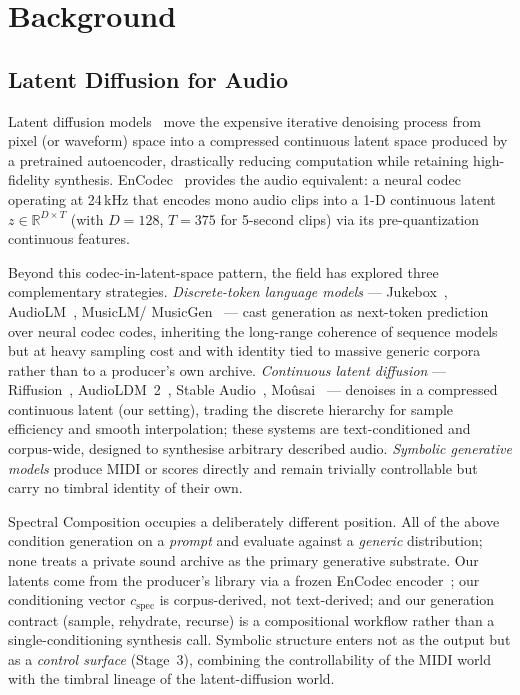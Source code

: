 \documentclass[12pt,a4paper]{article}
\begin{document}
\section{Background}
\label{sec:background}

\subsection{Latent Diffusion for Audio}
\label{subsec:bg_lda}

Latent diffusion models~\cite{rombach2022} move the expensive iterative
denoising process from pixel (or waveform) space into a compressed
continuous latent space produced by a pretrained autoencoder, drastically
reducing computation while retaining high-fidelity synthesis.
EnCodec~\cite{defossez2022} provides the audio equivalent: a neural codec
operating at 24\,kHz that encodes mono audio clips into a 1-D continuous
latent $z \in \mathbb{R}^{D \times T}$ (with $D=128$, $T=375$ for 5-second
clips) via its pre-quantization continuous features.

Beyond this codec-in-latent-space pattern, the field has explored three
complementary strategies. \emph{Discrete-token language models} —
Jukebox~\cite{jukebox2020}, AudioLM~\cite{audiolm2022}, MusicLM/
MusicGen~\cite{musiclm2023,audiocraft2023} — cast generation as
next-token prediction over neural codec codes, inheriting the long-range
coherence of sequence models but at heavy sampling cost and with identity
tied to massive generic corpora rather than to a producer's own archive.
\emph{Continuous latent diffusion} — Riffusion~\cite{riffusion2022},
AudioLDM~2~\cite{audioldm2_2023}, Stable Audio~\cite{stableaudio2023},
Mo\^usai~\cite{mousai2023} — denoises in a compressed continuous latent
(our setting), trading the discrete hierarchy for sample efficiency and
smooth interpolation; these systems are text-conditioned and corpus-wide,
designed to synthesise arbitrary described audio. \emph{Symbolic
generative models} produce MIDI or scores directly and remain trivially
controllable but carry no timbral identity of their own.

Spectral Composition occupies a deliberately different position. All of
the above condition generation on a \emph{prompt} and evaluate against a
\emph{generic} distribution; none treats a private sound archive as the
primary generative substrate. Our latents come from the producer's
library via a frozen EnCodec encoder~\cite{defossez2022}; our conditioning
vector $c_{\mathrm{spec}}$ is corpus-derived, not text-derived; and our
generation contract (sample, rehydrate, recurse) is a compositional
workflow rather than a single-conditioning synthesis call. Symbolic
structure enters not as the output but as a \emph{control surface}
(Stage~3), combining the controllability of the MIDI world with the
timbral lineage of the latent-diffusion world.
\end{document}
